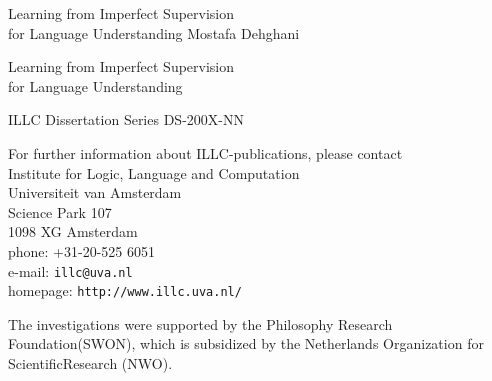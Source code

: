 {\pagestyle{empty}
\newcommand{\printtitle}{%
{\Huge Learning from Imperfect Supervision \\[0.8cm] for Language Understanding}}    %

\begin{titlepage}
\par\vskip 2cm
\begin{center}
\printtitle
\vfill
{\LARGE Mostafa Dehghani}                           %
\vskip 2cm
\end{center}
\end{titlepage}
%
%
\mbox{}\newpage
\setcounter{page}{1}

\par\vskip 2cm
\begin{center}
\printtitle
\end{center}

\clearpage
\par\vskip 2cm
\begin{center}
ILLC Dissertation Series DS-200X-NN                 %
\par\vspace {2cm}
\illclogo{10cm}
\par\vspace {2cm}
\noindent%
For further information about ILLC-publications, please contact\\[2ex]
Institute for Logic, Language and Computation\\
Universiteit van Amsterdam\\
Science Park 107\\
1098 XG Amsterdam\\
phone: +31-20-525 6051\\
e-mail: {\tt illc@uva.nl}\\
homepage: {\tt http://www.illc.uva.nl/}
\end{center}
\vfill

%
\noindent%
The investigations were supported by the            %
Philosophy Research Foundation\linebreak (SWON), 
which is subsidized by the Netherlands 
Organization for Scientific\linebreak Research (NWO).
\par\vspace {2cm}

}
